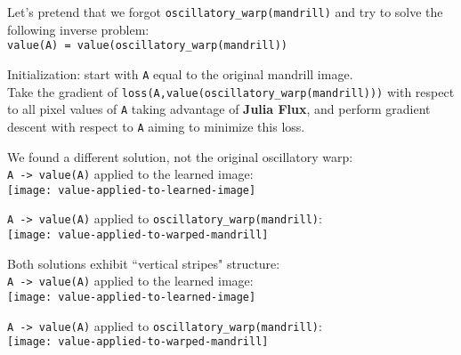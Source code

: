 \documentclass{beamer}
\newcommand{\msmagenta}[1]{{\color{mymagenta} #1}}
\begin{document}
\begin{frame}

Let's pretend that we forgot {\footnotesize\tt oscillatory\_warp(mandrill)} and try to solve the following inverse problem:\\[2ex]

\msmagenta{\footnotesize\tt value(A) = value(oscillatory\_warp(mandrill))\\[2ex]}


Initialization: start with {\footnotesize\tt A} equal to the original mandrill image.\\[2ex] 

Take the gradient of \msmagenta{\footnotesize\tt loss(A,value(oscillatory\_warp(mandrill)))} with respect to
all pixel values of {\footnotesize\tt A} taking advantage of {\bf Julia Flux}, and perform gradient descent with respect to
{\footnotesize\tt A} aiming to minimize this loss.


\end{frame}


\begin{frame}

We found a different solution, not the original oscillatory warp:\\[2ex]

{\footnotesize\tt A -> value(A)} applied to the learned image:\\[2ex]

\texttt{[image: value-applied-to-learned-image]}

{\footnotesize\tt A -> value(A)} applied to \msmagenta{\footnotesize\tt oscillatory\_warp(mandrill)}:\\[2ex]

\texttt{[image: value-applied-to-warped-mandrill]}
\end{frame}

\begin{frame}

Both solutions exhibit ``vertical stripes" structure:\\[2ex]

{\footnotesize\tt A -> value(A)} applied to the learned image:\\[2ex]

\texttt{[image: value-applied-to-learned-image]}

{\footnotesize\tt A -> value(A)} applied to \msmagenta{\footnotesize\tt oscillatory\_warp(mandrill)}:\\[2ex]

\texttt{[image: value-applied-to-warped-mandrill]}
\end{frame}
\end{document}
